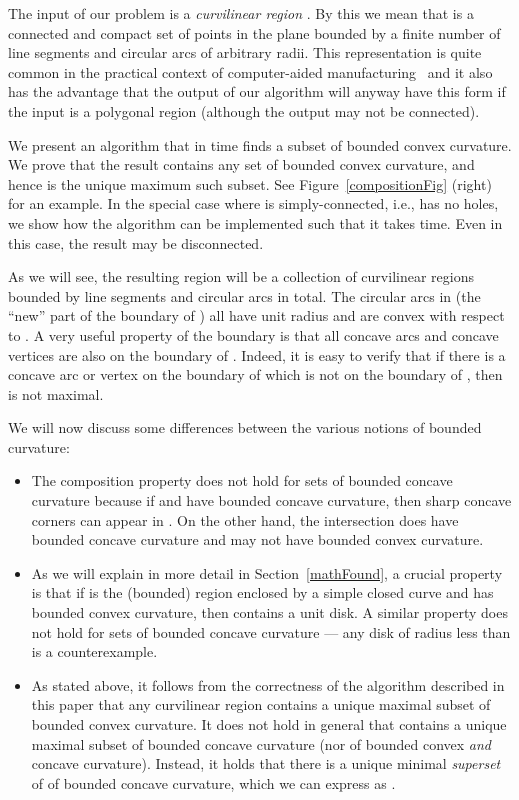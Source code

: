 \documentclass{article}
\begin{document}
The input of our problem is a \emph{curvilinear region} .
By this we mean that  is a connected and compact set of points in the plane bounded by a finite number  of line segments and circular arcs of arbitrary radii.
This representation is quite common in the practical context of computer-aided manufacturing~\cite{Held2005biarc} and it also has the advantage that the output of our algorithm will anyway have this form if the input is a polygonal region (although the output may not be connected).

We present an algorithm that in  time finds a subset  of bounded convex curvature.
We prove that the result  contains any set  of bounded convex curvature, and hence  is the unique maximum such subset.
See Figure~\ref{compositionFig} (right) for an example.
In the special case where  is simply-connected, i.e., has no holes, we show how the algorithm can be implemented such that it takes  time.
Even in this case, the result  may be disconnected.

As we will see, the resulting region  will be a collection of curvilinear regions bounded by  line segments and circular arcs in total.
The circular arcs in  (the ``new'' part of the boundary of ) all have unit radius and are convex with respect to .
A very useful property of the boundary  is that all concave arcs and concave vertices are also on the boundary of .
Indeed, it is easy to verify that if there is a concave arc or vertex on the boundary of  which is not on the boundary of , then  is not maximal.

We will now discuss some differences between the various notions of bounded curvature:
\begin{itemize}
\item
The composition property does not hold for sets of bounded concave curvature because if  and  have bounded concave curvature, then sharp concave corners can appear in .
On the other hand, the intersection  does have bounded concave curvature and may not have bounded convex curvature.

\item
As we will explain in more detail in Section~\ref{mathFound}, a crucial property is that if  is the (bounded) region enclosed by a simple closed curve  and  has bounded convex curvature, then  contains a unit disk.
A similar property does not hold for sets of bounded concave curvature --- any disk of radius less than  is a counterexample.

\item
As stated above, it follows from the correctness of the algorithm described in this paper that any curvilinear region  contains a unique maximal subset  of bounded convex curvature.
It does not hold in general that  contains a unique maximal subset of bounded concave curvature (nor of bounded convex \emph{and} concave curvature).
Instead, it holds that there is a unique minimal \emph{superset} of  of bounded concave curvature, which we can express as .
\end{itemize}
\end{document}
